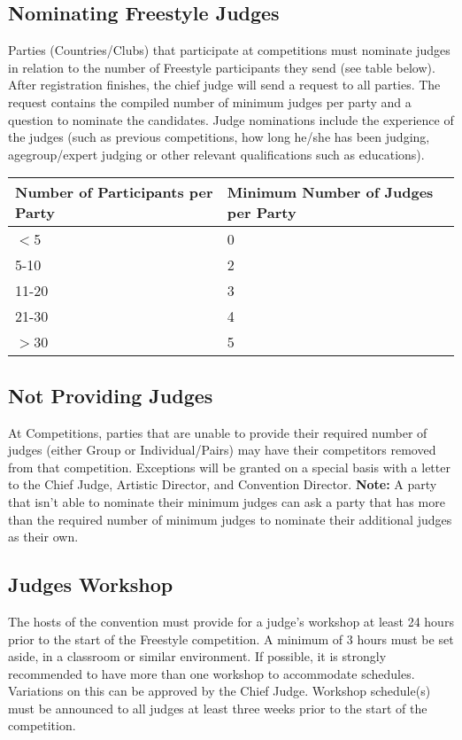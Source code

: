 \subsection{Nominating Freestyle Judges \label{subsec:freestyle_judging-panel_nominating-freestyle-judges}}
Parties (Countries/Clubs) that participate at competitions must nominate judges in relation to the number of Freestyle participants they send (see table below). 
After registration finishes, the chief judge will send a request to all parties.
The request contains the compiled number of minimum judges per party and a question to nominate the candidates.
Judge nominations include the experience of the judges (such as previous competitions, how long he/she has been judging, agegroup/expert judging or other relevant qualifications such as educations).

\begin{tabular}{|l|l|}
\hline
\textbf{Number of Participants per Party} & \textbf{Minimum Number of Judges per Party} \\
\hline
$<$5 & 0 \\
\hline
5-10 & 2 \\
\hline
11-20 & 3 \\
\hline
21-30 & 4 \\
\hline
$>$30 & 5 \\
\hline
\end{tabular}

\subsection{Not Providing Judges}
At Competitions, parties that are unable to provide their required number of judges (either Group or Individual/Pairs) may have their competitors removed from that competition.
Exceptions will be granted on a special basis with a letter to the Chief Judge, Artistic Director, and Convention Director. 
\textbf{Note:} A party that isn’t able to nominate their minimum judges can ask a party that has more than the required number of minimum judges to nominate their additional judges as their own.

\subsection{Judges Workshop}
The hosts of the convention must provide for a judge's workshop at least 24 hours prior to the start of the Freestyle competition.
A minimum of 3 hours must be set aside, in a classroom or similar environment.
If possible, it is strongly recommended to have more than one workshop to accommodate schedules.
Variations on this can be approved by the Chief Judge.
Workshop schedule(s) must be announced to all judges at least three weeks prior to the start of the competition.

